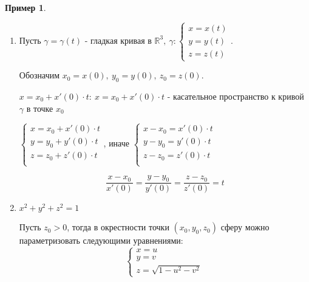 \documentclass{report}
\theoremstyle{definition}
\newtheorem{example}{Пример}
\begin{document}
\begin{example}
  \begin{enumerate}
    \item Пусть $\gamma = \gamma (t)$ - гладкая кривая в $\mathbb{R}^3, \ \gamma:\left\{\begin{array}{c}
              x = x(t) \\
              y = y(t) \\
              z = z(t)
            \end{array}\right.$.

          Обозначим $x_0 = x(0), \ y_0 = y(0), \ z_0 = z(0)$.

          $x = x_0 + x'(0) \cdot t: \ x = x_0 + x'(0) \cdot t$ - касательное пространство к кривой $\gamma$ в точке $x_0$
          \begin{center}
            $\left\{\begin{array}{l}
                x = x_0 + x'(0) \cdot t \\
                y = y_0 + y'(0) \cdot t \\
                z = z_0 + z'(0) \cdot t \\
              \end{array}\right.$, иначе $\left\{\begin{array}{l}
                x - x_0 = x'(0)\cdot t \\
                y - y_0 = y'(0)\cdot t \\
                z - z_0 = z'(0)\cdot t \\
              \end{array}\right.$
          \end{center}
          \begin{equation*}
            \frac{x - x_0}{x'(0)} = \frac{y - y_0}{y'(0)} = \frac{z - z_0}{z'(0)} = t
          \end{equation*}

    \item $x^2 + y^2 + z^2 = 1$

          Пусть $z_0 > 0$, тогда в окрестности точки $(x_0,y_0,z_0)$ сферу можно параметризовать следующими уравнениями:
          \begin{equation*}
            \left\{\begin{array}{l}
              x = u \\
              y = v \\
              z = \sqrt{1 - u^2 - v^2}
            \end{array}\right.
          \end{equation*}


\end{enumerate}
\end{example}
\end{document}
